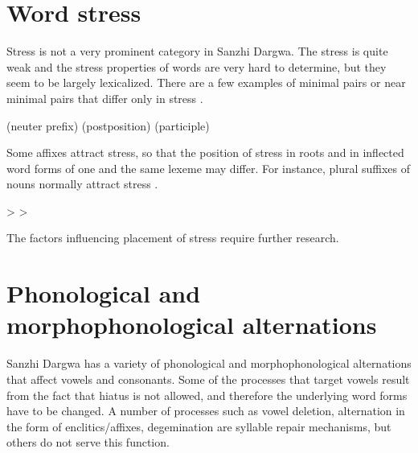 
\section{Word stress}
\label{sec:Word stress}

Stress is not a very prominent category in Sanzhi Dargwa. The stress is quite weak and the stress properties of words are very hard to determine, but they seem to be largely lexicalized. There are a few examples of minimal pairs or near minimal pairs that differ only in stress .
%
\begin{exe}
	\ex	\label{ex:stress minimal pairs phon}
	\begin{xlist}
\TabPositions{14em}
		\ex	{} 		\tab {}  (neuter prefix)
		\ex	{} 		\tab {} 		
		\ex	{}  (postposition) \tab {}  (participle)
		\ex	{}  \tab {} 
	\end{xlist}
\end{exe}

Some affixes attract stress, so that the position of stress in roots and in inflected word forms of one and the same lexeme may differ. For instance, plural suffixes of nouns normally attract stress .
%
\begin{exe}
	\ex	\label{ex:plural attract stress phon}
	\begin{xlist}
		\ex	{}  >  \sqt{sack\tsc{-pl}}
		\ex	{}  >  \sqt{pit\tsc{-pl}}
	\end{xlist}
\end{exe}

The factors influencing placement of stress require further research.



\section{Phonological and morphophonological alternations}
\label{sec:Phonological and morphophonological alternations}

Sanzhi Dargwa has a variety of phonological and morphophonological alternations that affect vowels and consonants. Some of the processes that target vowels result from the fact that hiatus is not allowed, and therefore the underlying word forms have to be changed. A number of processes such as vowel deletion, alternation in the form of enclitics\slash affixes, degemination are syllable repair mechanisms, but others do not serve this function.


